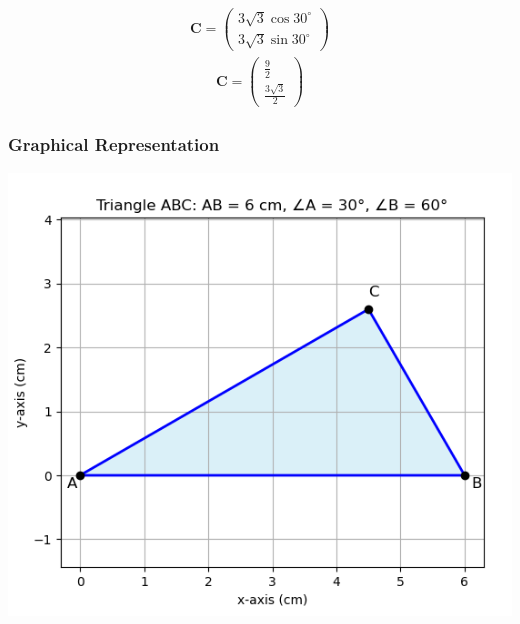 \documentclass{beamer}
\theoremstyle{remark}
\newcommand{\myvec}[1]{\ensuremath{\begin{pmatrix}#1\end{pmatrix}}}
\let\vec\mathbf
\numberwithin{equation}{section}
\begin{document}
\begin{align}
    \vec{C}=\myvec{3\sqrt{3} \cos 30^\circ\\3\sqrt{3} \sin 30^\circ}
\end{align}       
\begin{align}
    \vec{C}=\myvec{\frac{9}{2}\\ \frac{3\sqrt{3}}{2}}
\end{align}
\frametitle{Graphical Representation}
\centering
\includegraphics[width=0.6\linewidth]{figs/fig1.png}
        
\end{document}
